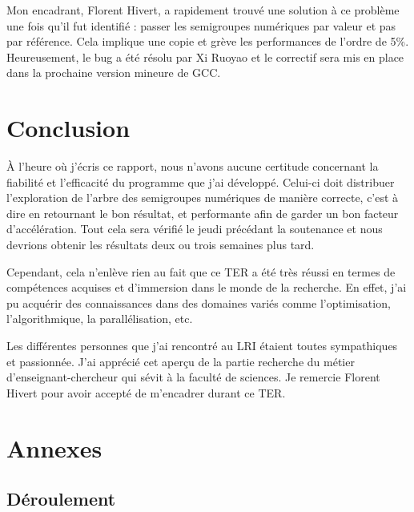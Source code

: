\documentclass[12pt,a4paper]{report}
\begin{document}
Mon encadrant, Florent Hivert, a rapidement trouvé une solution à ce problème une fois qu'il fut identifié : passer les semigroupes numériques par valeur et pas par référence. Cela implique une copie et grève les performances de l'ordre de 5\%. Heureusement, le bug a été résolu par Xi Ruoyao et le correctif sera mis en place dans la prochaine version mineure de GCC.

\chapter*{Conclusion}

À l'heure où j'écris ce rapport, nous n'avons aucune certitude concernant la fiabilité et l'efficacité du programme que j'ai développé. Celui-ci doit distribuer l'exploration de l'arbre des semigroupes numériques de manière correcte, c'est à dire en retournant le bon résultat, et performante afin de garder un bon facteur d'accélération. Tout cela sera vérifié le jeudi précédant la soutenance et nous devrions obtenir les résultats deux ou trois semaines plus tard.

Cependant, cela n'enlève rien au fait que ce TER a été très réussi en termes de compétences acquises et d'immersion dans le monde de la recherche. En effet, j'ai pu acquérir des connaissances dans des domaines variés comme l'optimisation, l'algorithmique, la parallélisation, etc.

Les différentes personnes que j'ai rencontré au LRI étaient toutes sympathiques et passionnée. J'ai apprécié cet aperçu de la partie recherche du métier d'enseignant-chercheur qui sévit à la faculté de sciences. Je remercie Florent Hivert pour avoir accepté de m'encadrer durant ce TER.

\printbibliography
{}

\chapter*{Annexes}
\renewcommand{\thesection}{\Roman{section}}
\setcounter{section}{0}

\section{Déroulement}
\label{anx:deroulement}
\end{document}
